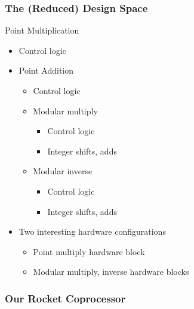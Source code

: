 \documentclass{beamer}
\begin{document}
\begin{frame}
  \frametitle{The (Reduced) Design Space}

  \begin{multicols}{2}
    \begin{minipage}{\linewidth}
      Point Multiplication
      \begin{itemize}
      \item Control logic
      \item Point Addition
        \begin{itemize}
        \item Control logic
        \item Modular multiply
          \begin{itemize}
          \item Control logic
          \item Integer shifts, adds
          \end{itemize}
        \item Modular inverse
          \begin{itemize}
          \item Control logic
          \item Integer shifts, adds
          \end{itemize}
        \end{itemize}
      \end{itemize}
    \end{minipage}

    \begin{minipage}{\linewidth}
      \begin{itemize}
      \item Two interesting hardware configurations
        \begin{itemize}
        \item Point multiply hardware block
        \item Modular multiply, inverse hardware blocks
        \end{itemize}
      \end{itemize}
    \end{minipage}
  \end{multicols}
\end{frame}

\begin{frame}
  \frametitle{Our Rocket Coprocessor}

  \begin{center}
    \begin{minipage}{0.5\linewidth}
      
    \end{minipage}
  \end{center}
\end{frame}
\end{document}
